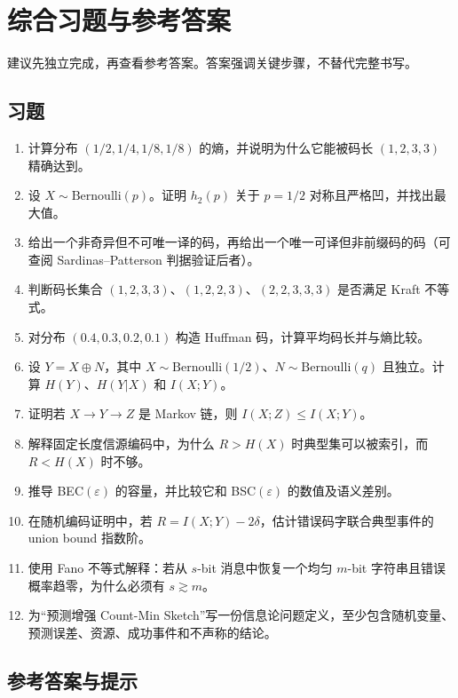 \chapter{综合习题与参考答案}

建议先独立完成，再查看参考答案。答案强调关键步骤，不替代完整书写。

\section{习题}

\begin{enumerate}[label=\textbf{I\arabic*.}]
  \item 计算分布 $(1/2,1/4,1/8,1/8)$ 的熵，并说明为什么它能被码长 $(1,2,3,3)$ 精确达到。
  \item 设 $X\sim\mathrm{Bernoulli}(p)$。证明 $h_2(p)$ 关于 $p=1/2$ 对称且严格凹，并找出最大值。
  \item 给出一个非奇异但不可唯一译的码，再给出一个唯一可译但非前缀码的码（可查阅 Sardinas--Patterson 判据验证后者）。
  \item 判断码长集合 $(1,2,3,3)$、$(1,2,2,3)$、$(2,2,3,3,3)$ 是否满足 Kraft 不等式。
  \item 对分布 $(0.4,0.3,0.2,0.1)$ 构造 Huffman 码，计算平均码长并与熵比较。
  \item 设 $Y=X\oplus N$，其中 $X\sim\mathrm{Bernoulli}(1/2)$、$N\sim\mathrm{Bernoulli}(q)$ 且独立。计算 $H(Y)$、$H(Y|X)$ 和 $I(X;Y)$。
  \item 证明若 $X\to Y\to Z$ 是 Markov 链，则 $I(X;Z)\le I(X;Y)$。
  \item 解释固定长度信源编码中，为什么 $R>H(X)$ 时典型集可以被索引，而 $R<H(X)$ 时不够。
  \item 推导 BEC$(\varepsilon)$ 的容量，并比较它和 BSC$(\varepsilon)$ 的数值及语义差别。
  \item 在随机编码证明中，若 $R=I(X;Y)-2\delta$，估计错误码字联合典型事件的 union bound 指数阶。
  \item 使用 Fano 不等式解释：若从 $s$-bit 消息中恢复一个均匀 $m$-bit 字符串且错误概率趋零，为什么必须有 $s\gtrsim m$。
  \item 为“预测增强 Count-Min Sketch”写一份信息论问题定义，至少包含随机变量、预测误差、资源、成功事件和不声称的结论。
\end{enumerate}

\section{参考答案与提示}

